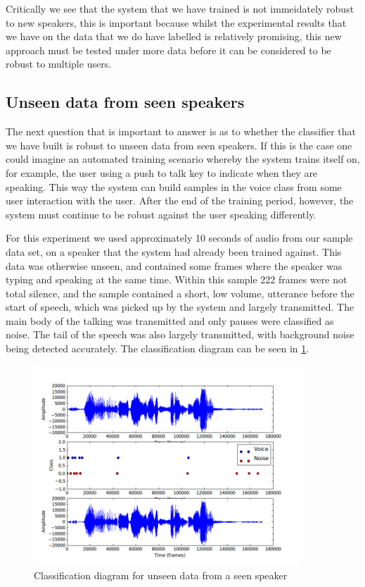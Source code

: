 \documentclass[ %
                    author={Sam Phippen},
                supervisor={Dr. Rafal Bogacz},
                     title={Real time voice activity detectors in noisy personal computing environments},
                  subtitle={},
                    degree={MEng},
                      year={2012} ]{thesis}
\begin{document}
Critically we see that the system that we have trained is not immeidately
robust to new speakers, this is important because whilst the experimental
results that we have on the data that we do have labelled is relatively
promising, this new approach must be tested under more data before it can be
considered to be robust to multiple users.

\subsection{Unseen data from seen speakers}

The next question that is important to answer is as to whether the classifier
that we have built is robust to unseen data from seen speakers. If this is the
case one could imagine an automated training scenario whereby the system trains
itself on, for example, the user using a push to talk key to indicate when they
are speaking. This way the system can build samples in the voice class from some
user interaction with the user. After the end of the training period, however,
the system must continue to be robust against the user speaking differently.

For this experiment we used approximately 10 seconds of audio from our sample
data set, on a speaker that the system had already been trained against. This
data was otherwise unseen, and contained some frames where the speaker was
typing and speaking at the same time. Within this sample 222 frames were not
total silence, and the sample contained a short, low volume,  utterance before
the start of speech, which was picked up by the system and largely transmitted.
The main body of the talking was transmitted and only pauses were classified as
noise. The tail of the speech was also largely transmitted, with background
noise being detected accurately. The classification diagram can be seen in
\ref{fig:ultimation}.

\begin{figure}
    \label{fig:ultimation}
    \includegraphics[width=10cm]{ultimation.png}
    \caption{Classification diagram for unseen data from a seen speaker}
\end{figure}
\end{document}
